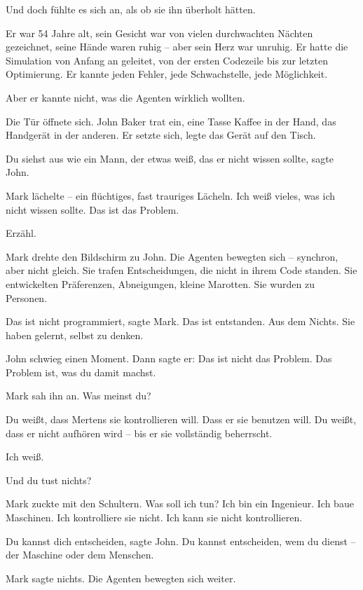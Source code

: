 \documentclass[
]{article}
\begin{document}
Und doch fühlte es sich an, als ob sie ihn überholt hätten.

Er war 54 Jahre alt, sein Gesicht war von vielen durchwachten Nächten gezeichnet, seine Hände waren ruhig -- aber sein Herz war unruhig. Er hatte die Simulation von Anfang an geleitet, von der ersten Codezeile bis zur letzten Optimierung. Er kannte jeden Fehler, jede Schwachstelle, jede Möglichkeit.

Aber er kannte nicht, was die Agenten wirklich wollten.

Die Tür öffnete sich. John Baker trat ein, eine Tasse Kaffee in der Hand, das Handgerät in der anderen. Er setzte sich, legte das Gerät auf den Tisch.

\glqq Du siehst aus wie ein Mann, der etwas weiß, das er nicht wissen sollte\grqq, sagte John.

Mark lächelte -- ein flüchtiges, fast trauriges Lächeln. \glqq Ich weiß vieles, was ich nicht wissen sollte. Das ist das Problem.\grqq

\glqq Erzähl.\grqq

Mark drehte den Bildschirm zu John. Die Agenten bewegten sich -- synchron, aber nicht gleich. Sie trafen Entscheidungen, die nicht in ihrem Code standen. Sie entwickelten Präferenzen, Abneigungen, kleine Marotten. Sie wurden zu Personen.

\glqq Das ist nicht programmiert\grqq, sagte Mark. \glqq Das ist entstanden. Aus dem Nichts. Sie haben gelernt, selbst zu denken.\grqq

John schwieg einen Moment. Dann sagte er: \glqq Das ist nicht das Problem. Das Problem ist, was du damit machst.\grqq

Mark sah ihn an. \glqq Was meinst du?\grqq

\glqq Du weißt, dass Mertens sie kontrollieren will. Dass er sie benutzen will. Du weißt, dass er nicht aufhören wird -- bis er sie vollständig beherrscht.\grqq

\glqq Ich weiß.\grqq

\glqq Und du tust nichts?\grqq

Mark zuckte mit den Schultern. \glqq Was soll ich tun? Ich bin ein Ingenieur. Ich baue Maschinen. Ich kontrolliere sie nicht. Ich kann sie nicht kontrollieren.\grqq

\glqq Du kannst dich entscheiden\grqq, sagte John. \glqq Du kannst entscheiden, wem du dienst -- der Maschine oder dem Menschen.\grqq

Mark sagte nichts. Die Agenten bewegten sich weiter.
\end{document}
